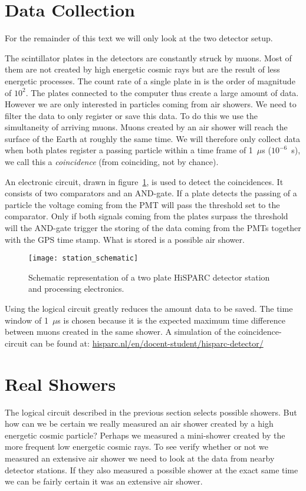 \section{Data Collection}
For the remainder of this text we will only look at the two detector setup.

The scintillator plates in the detectors are constantly struck by muons. Most of them are not created by high energetic cosmic rays but are the result of less energetic processes. The count rate of a single plate in is the order of magnitude of $10^2$. The plates connected to the computer thus create a large amount of data. However we are only interested in particles coming from air showers. We need to filter the data to only register or save this data. To do this we use the simultaneity of arriving muons. Muons created by an air shower will reach the surface of the Earth at roughly the same time. We will therefore only collect data when both plates register a passing particle within a time frame of 1~$\mu$s ($10^{-6}$~s), we call this a \emph{coincidence} (from coinciding, not by chance). 

An electronic circuit, drawn in figure~\ref{fig:station_schematic}, is used to detect the coincidences. It consists of two comparators and an AND-gate. If a plate detects the passing of a particle the voltage coming from the PMT will pass the threshold set to the comparator. Only if both signals coming from the plates surpass the threshold will the AND-gate trigger the storing of the data coming from the PMTs together with the GPS time stamp. What is stored is a possible air shower. 

\begin{figure}\begin{center}
\texttt{[image: station\_schematic]}%
\caption{Schematic representation of a two plate HiSPARC detector station and processing electronics. }\label{fig:station_schematic}
\end{center}\end{figure}

Using the logical circuit greatly reduces the amount data to be saved. The time window of 1~$\mu$s is chosen because it is the expected maximum time difference between muons created in the same shower. A simulation of the coincidence-circuit can be found at:
\url{hisparc.nl/en/docent-student/hisparc-detector/}

\section{Real Showers}
The logical circuit described in the previous section selects possible showers. But how can we be certain we really measured an air shower created by a high energetic cosmic particle? Perhaps we measured a mini-shower created by the more frequent low energetic cosmic rays. To see verify whether or not we measured an extensive air shower we need to look at the data from nearby detector stations. If they also measured a possible shower at the exact same time we can be fairly certain it was an extensive air shower.

